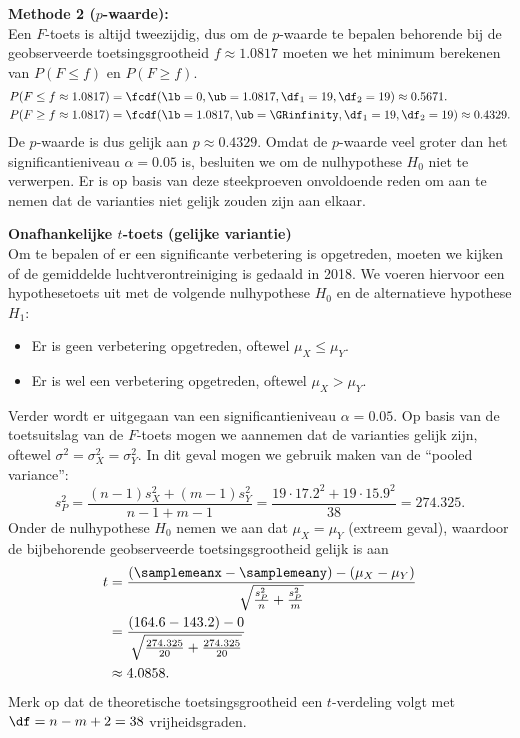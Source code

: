 {    {\noindent\bfseries Methode 2 ($p$-waarde):} \\
    Een $F$-toets is altijd tweezijdig, dus om de $p$-waarde te bepalen behorende bij de geobserveerde toetsingsgrootheid $f \approx 1.0817$ moeten we
    het minimum berekenen van $P(F \leq f)$ en $P(F \geq f)$.
    \begin{align*}
        P(F \leq f \approx 1.0817) &= \fcdf(\lb=0, \ub=1.0817, \df_1=19, \df_2=19) \approx 0.5671.\\
        P(F \geq f \approx 1.0817) &= \fcdf(\lb=1.0817, \ub=\GRinfinity, \df_1=19, \df_2=19) \approx 0.4329.
    \end{align*}
    De $p$-waarde is dus gelijk aan $p\approx 0.4329$.
    Omdat de $p$-waarde veel groter dan het significantieniveau $\alpha=0.05$ is, besluiten we om de nulhypothese $H_0$ niet te verwerpen.
    Er is op basis van deze steekproeven onvoldoende reden om aan te nemen dat de varianties niet gelijk zouden zijn aan elkaar.\\
    \medskip

    {\noindent\bfseries Onafhankelijke \boldmath$t$-toets (gelijke variantie)}\\
    Om te bepalen of er een significante verbetering is opgetreden, moeten we kijken of de gemiddelde luchtverontreiniging is gedaald in 2018.
    We voeren hiervoor een hypothesetoets uit met de volgende nulhypothese $H_0$ en de alternatieve hypothese $H_1$:
    \begin{itemize}
        \item[$H_0$:] Er is geen verbetering opgetreden, oftewel $\mu_X \le \mu_Y$.
        \item[$H_1$:] Er is wel een verbetering opgetreden, oftewel $\mu_X > \mu_Y$.
    \end{itemize}
    Verder wordt er uitgegaan van een significantieniveau $\alpha = 0.05$.
    Op basis van de toetsuitslag van de $F$-toets mogen we aannemen dat de varianties gelijk zijn, oftewel $\sigma^2 = \sigma_X^2 = \sigma_Y^2$.
    In dit geval mogen we gebruik maken van de \enquote{pooled variance}:
    \[
        s_P^2 = \frac{(n-1) s_X^2 + (m-1) s_Y^2}{n-1+m-1} = \frac{19 \cdot 17.2^2 + 19 \cdot 15.9^2}{38} = 274.325.
    \]
    Onder de nulhypothese $H_0$ nemen we aan dat $\mu_X = \mu_Y$ (extreem geval), waardoor de bijbehorende geobserveerde toetsingsgrootheid gelijk is aan
    \begin{align*}
        t   &= \frac{(\samplemeanx - \samplemeany) - (\mu_X-\mu_Y)}{\sqrt{\frac{s_P^2}{n} + \frac{s_P^2}{m}}} \\
            &= \frac{(164.6 - 143.2) - 0}{\sqrt{\frac{274.325}{20} + \frac{274.325}{20}}} \\
            &\approx 4.0858.
    \end{align*}
    Merk op dat de theoretische toetsingsgrootheid een $t$-verdeling volgt met $\df=n-m+2=38$ vrijheidsgraden.\\[1ex]

}
